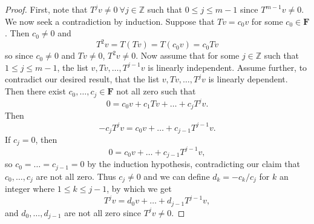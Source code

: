 \documentclass{article}
\theoremstyle{definition}
\begin{document}
\begin{proof}
  First, note that $T^j v \neq 0\ \forall j \in \mathbb{Z}$ such that $0 \leq j \leq m-1$ since $T^{m - 1}v \neq 0$. 
  We now seek a contradiction by induction.
  Suppose that $Tv = c_0 v$ for some $c_0 \in \mathbf{F}$.
  Then $c_0 \neq 0$ and \begin{equation*}
    T^2 v = T(Tv) = T(c_0 v) = c_0 Tv
  \end{equation*}
  so since $c_0 \neq 0$ and $Tv \neq 0$, $T^2 v \neq 0$.
  Now assume that for some $j \in \mathbb{Z}$ such that $1 \leq j \leq m - 1$, the list $v, Tv, \dots, T^{j - 1}v$ is linearly independent.
  Assume further, to contradict our desired result, that the list $v, Tv, \dots, T^j v$ is linearly dependent.
  Then there exist $c_0, \dots, c_j \in \mathbf{F}$ not all zero such that \begin{equation*}
    0 = c_0 v + c_1 Tv + \dots + c_j T^j v.
  \end{equation*}
  Then \begin{equation*}
    -c_j T^j v = c_0v + \dots + c_{j - 1} T^{j - 1} v.
  \end{equation*}
  If $c_j = 0$, then \begin{equation*}
    0 = c_0v + \dots + c_{j - 1} T^{j - 1} v,
  \end{equation*}
  so $c_0 = \dots = c_{j - 1} = 0$ by the induction hypothesis, contradicting our claim that $c_0, \dots, c_j$ are not all zero.
  Thus $c_j \neq 0$ and we can define $d_k = -c_k / c_j$ for $k$ an integer where $1 \leq k \leq j - 1$, by which we get \begin{equation*}
    T^j v = d_0 v + \dots + d_{j - 1} T^{j - 1} v,
  \end{equation*}
  and $d_0, \dots, d_{j - 1}$ are not all zero since $T^j v \neq 0$.


\end{proof}
\end{document}
